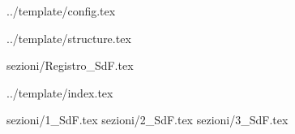  {../template/config.tex}


\def\DOCUMENTO{Studio di Fattibilit\`a}
\def\VERSIONE{v0.2.0}

\def\DESCRIZIONE{<Info documento>}

\def\REDATTORE {<Redattore>}
\def\VERIFICATORE {<Verificatore>}
\def\RESPONSABILE {<Responsabile>}

\def\USO {Interno}

\def\DISTRIBUZIONE {\GRUPPO{}\\ & \COMMITTENTE{}\\}

\def\DESCRIZIONE {<Descrizione>}


\def\INDICE	{true}
\def\TABELLE {false}
\def\FIGURE {false}


 {../template/structure.tex}

 {sezioni/Registro_SdF.tex}

 {../template/index.tex}

 {sezioni/1_SdF.tex}
 {sezioni/2_SdF.tex}
 {sezioni/3_SdF.tex}






